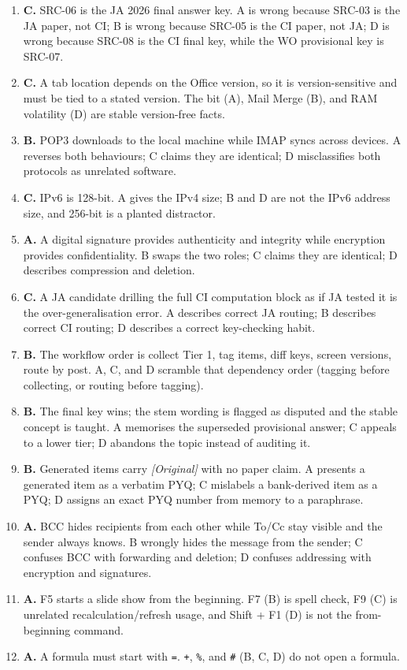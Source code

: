 \documentclass[11pt]{article}
\begin{document}
\begin{enumerate}[label=\textbf{Q\arabic*.}, leftmargin=*]
\item \textbf{C.} SRC-06 is the JA 2026 final answer key. A is wrong because SRC-03 is the JA paper, not CI; B is wrong because SRC-05 is the CI paper, not JA; D is wrong because SRC-08 is the CI final key, while the WO provisional key is SRC-07.
\item \textbf{C.} A tab location depends on the Office version, so it is version-sensitive and must be tied to a stated version. The bit (A), Mail Merge (B), and RAM volatility (D) are stable version-free facts.
\item \textbf{B.} POP3 downloads to the local machine while IMAP syncs across devices. A reverses both behaviours; C claims they are identical; D misclassifies both protocols as unrelated software.
\item \textbf{C.} IPv6 is 128-bit. A gives the IPv4 size; B and D are not the IPv6 address size, and 256-bit is a planted distractor.
\item \textbf{A.} A digital signature provides authenticity and integrity while encryption provides confidentiality. B swaps the two roles; C claims they are identical; D describes compression and deletion.
\item \textbf{C.} A JA candidate drilling the full CI computation block as if JA tested it is the over-generalisation error. A describes correct JA routing; B describes correct CI routing; D describes a correct key-checking habit.
\item \textbf{B.} The workflow order is collect Tier 1, tag items, diff keys, screen versions, route by post. A, C, and D scramble that dependency order (tagging before collecting, or routing before tagging).
\item \textbf{B.} The final key wins; the stem wording is flagged as disputed and the stable concept is taught. A memorises the superseded provisional answer; C appeals to a lower tier; D abandons the topic instead of auditing it.
\item \textbf{B.} Generated items carry \textit{[Original]} with no paper claim. A presents a generated item as a verbatim PYQ; C mislabels a bank-derived item as a PYQ; D assigns an exact PYQ number from memory to a paraphrase.
\item \textbf{A.} BCC hides recipients from each other while To/Cc stay visible and the sender always knows. B wrongly hides the message from the sender; C confuses BCC with forwarding and deletion; D confuses addressing with encryption and signatures.
\item \textbf{A.} F5 starts a slide show from the beginning. F7 (B) is spell check, F9 (C) is unrelated recalculation/refresh usage, and Shift + F1 (D) is not the from-beginning command.
\item \textbf{A.} A formula must start with \texttt{=}. \texttt{+}, \texttt{\%}, and \texttt{\#} (B, C, D) do not open a formula.


\end{enumerate}
\end{document}
